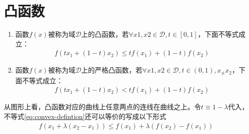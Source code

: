 \chapter{凸函数}
\label{chap:convex-functions}

\begin{definition}[凸函数]

  \begin{enumerate}
  \item 函数$f(x)$被称为域$\mathcal{D}$上的凸函数，若$\forall x1,x2\in\mathcal{D}, t\in[0,1]$，下面不等式成立：
    \begin{align}\label{eq:convex-defintion}
      f\left(tx_1+(1-t)x_2\right)\le tf(x_1) + (1-t)f(x_2)
    \end{align}
  \item 函数$f(x)$被称为域$\mathcal{D}$上的严格凸函数，若$\forall x1,x2\in\mathcal{D}, t\in(0,1),x_\ne x_2$，下面不等式成立：
    \begin{align}
      f\left(tx_1+(1-t)x_2\right)< tf(x_1) + (1-t)f(x_2)
    \end{align}
  \end{enumerate}
\end{definition}

从图形上看，凸函数对应的曲线上任意两点的连线在曲线之上。令$t\equiv 1-\lambda$代入，不等式\ref{eq:convex-defintion}还可以等价的写成以下形式
\begin{align*}
  f\left(x_1+\lambda(x_2-x_1)\right)\le f(x_1) + \lambda \left(f(x_2)-f(x_1)\right)
\end{align*}


